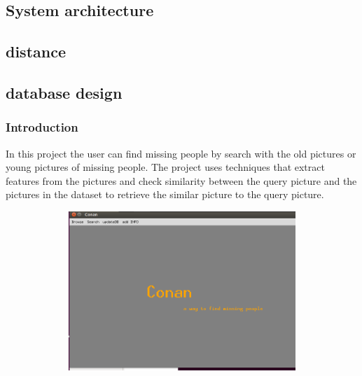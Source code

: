 \documentclass{beamer}
\begin{document}
	\subsection{System architecture}
	\subsection{distance}
	\subsection{database design}


	
	\begin{frame}
		\frametitle{Introduction
		}
	In this project the user can find missing people by search with the old pictures
	or young pictures of missing people. The project uses techniques that extract
	features from the pictures and check similarity between the query picture and
	the pictures in the dataset to retrieve the similar picture to the query picture.
	\begin{figure}[H]
		\centering
		\includegraphics[width=120mm,height=60mm]{fig/00.png}
	\end{figure}
	\end{frame}
\end{document}
